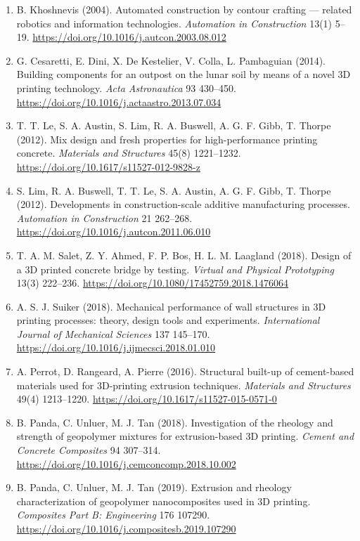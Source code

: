 \documentclass[
  11pt,
  letterpaper,
]{article}
\begin{document}
\begin{enumerate}
\item
  B. Khoshnevis (2004). Automated construction by contour crafting ---
  related robotics and information technologies. \emph{Automation in
  Construction} 13(1) 5--19.
  \url{https://doi.org/10.1016/j.autcon.2003.08.012}
\item
  G. Cesaretti, E. Dini, X. De Kestelier, V. Colla, L. Pambaguian
  (2014). Building components for an outpost on the lunar soil by means
  of a novel 3D printing technology. \emph{Acta Astronautica} 93
  430--450. \url{https://doi.org/10.1016/j.actaastro.2013.07.034}
\item
  T. T. Le, S. A. Austin, S. Lim, R. A. Buswell, A. G. F. Gibb, T.
  Thorpe (2012). Mix design and fresh properties for high-performance
  printing concrete. \emph{Materials and Structures} 45(8) 1221--1232.
  \url{https://doi.org/10.1617/s11527-012-9828-z}
\item
  S. Lim, R. A. Buswell, T. T. Le, S. A. Austin, A. G. F. Gibb, T.
  Thorpe (2012). Developments in construction-scale additive
  manufacturing processes. \emph{Automation in Construction} 21
  262--268. \url{https://doi.org/10.1016/j.autcon.2011.06.010}
\item
  T. A. M. Salet, Z. Y. Ahmed, F. P. Bos, H. L. M. Laagland (2018).
  Design of a 3D printed concrete bridge by testing. \emph{Virtual and
  Physical Prototyping} 13(3) 222--236.
  \url{https://doi.org/10.1080/17452759.2018.1476064}
\item
  A. S. J. Suiker (2018). Mechanical performance of wall structures in
  3D printing processes: theory, design tools and experiments.
  \emph{International Journal of Mechanical Sciences} 137 145--170.
  \url{https://doi.org/10.1016/j.ijmecsci.2018.01.010}
\item
  A. Perrot, D. Rangeard, A. Pierre (2016). Structural built-up of
  cement-based materials used for 3D-printing extrusion techniques.
  \emph{Materials and Structures} 49(4) 1213--1220.
  \url{https://doi.org/10.1617/s11527-015-0571-0}
\item
  B. Panda, C. Unluer, M. J. Tan (2018). Investigation of the rheology
  and strength of geopolymer mixtures for extrusion-based 3D printing.
  \emph{Cement and Concrete Composites} 94 307--314.
  \url{https://doi.org/10.1016/j.cemconcomp.2018.10.002}
\item
  B. Panda, C. Unluer, M. J. Tan (2019). Extrusion and rheology
  characterization of geopolymer nanocomposites used in 3D printing.
  \emph{Composites Part B: Engineering} 176 107290.
  \url{https://doi.org/10.1016/j.compositesb.2019.107290}

\end{enumerate}
\end{document}
